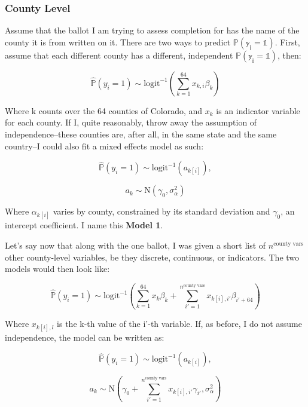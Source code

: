 \documentclass[12pt,twoside]{reedthesis}
\begin{document}
  \subsubsection{County Level}\label{county-level}
  
  Assume that the ballot I am trying to assess completion for has the name
  of the county it is from written on it. There are two ways to predict
  \(\mathbb{P(y_i = 1)}\). First, assume that each different county has a
  different, independent \(\mathbb{P(y_i = 1)}\), then:
  
  \[\hat{\mathbb{P}}(y_i = 1) \sim \text{logit}^{-1}(\sum_{k = 1}^{64}x_{k,i}\beta_{k})\]
  
  Where k counts over the 64 counties of Colorado, and \(x_{k}\) is an
  indicator variable for each county. If I, quite reasonably, throw away
  the assumption of independence--these counties are, after all, in the
  same state and the same country--I could also fit a mixed effects model
  as such:
  
  \begin{equation} \tag{Model 1}
  \hat{\mathbb{P}}(y_i = 1) \sim \text{logit}^{-1}(a_{k[i]}),
  \end{equation}
  
  \[a_{k} \sim \text{N}(\gamma_0, \sigma_{\alpha}^2)\]
  
  Where \(\alpha_{k[i]}\) varies by county, constrained by its standard
  deviation and \(\gamma_0\), an intercept coefficient. I name this
  \textbf{Model 1}.
  
  Let's say now that along with the one ballot, I was given a short list
  of \(n^{\text{county vars}}\) other county-level variables, be they
  discrete, continuous, or indicators. The two models would then look
  like:
  
  \[\hat{\mathbb{P}}(y_i = 1) \sim \text{logit}^{-1}(\sum_{k = 1}^{64}x_{k}\beta_{k} + \sum_{i'=1}^{n^{\text{county vars}}}x_{k[i], i'}\beta_{i'+64})\]
  
  Where \(x_{k[i], l}\) is the k-th value of the i'-th variable. If, as
  before, I do not assume independence, the model can be written as:
  
  \begin{equation} \tag{Model 2}  
  \hat{\mathbb{P}}(y_i = 1) \sim \text{logit}^{-1}(a_{k[i]}),
  \end{equation}
  
  \[a_{k} \sim \text{N}(\gamma_0 + \sum_{i'=1}^{n^{\text{county vars}}}x_{k[i], i'}\gamma_{i'}, \sigma_{\alpha}^2)\]
  
\end{document}
